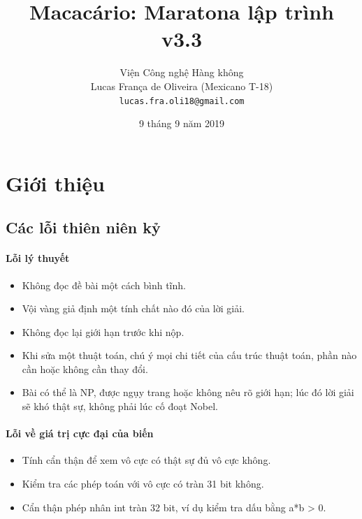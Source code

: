 \documentclass[11pt]{article}
\title{Macacário: Maratona lập trình v3.3}
\author{Viện Công nghệ Hàng không\\Lucas França de Oliveira (Mexicano T-18)\\\texttt{lucas.fra.oli18@gmail.com}}
\date{9 tháng 9 năm 2019}
\begin{document}
\maketitle


\tableofcontents

\clearpage

\section{Giới thiệu}

\subsection{Các lỗi thiên niên kỷ}

\paragraph{Lỗi lý thuyết}\begin{itemize}

\item Không đọc đề bài một cách bình tĩnh.

\item Vội vàng giả định một tính chất nào đó của lời giải.

\item Không đọc lại giới hạn trước khi nộp.

\item Khi sửa một thuật toán, chú ý mọi chi tiết của cấu trúc thuật toán, phần nào cần hoặc không cần thay đổi.

\item Bài có thể là NP, được ngụy trang hoặc không nêu rõ giới hạn; lúc đó lời giải sẽ khó thật sự, không phải lúc cố đoạt Nobel.

\end{itemize}

\paragraph{Lỗi về giá trị cực đại của biến}\begin{itemize}

\item Tính cẩn thận để xem vô cực có thật sự đủ vô cực không.

\item Kiểm tra các phép toán với vô cực có tràn 31 bit không.

\item Cẩn thận phép nhân int tràn 32 bit, ví dụ kiểm tra dấu bằng a*b > 0.

\end{itemize}
\end{document}
